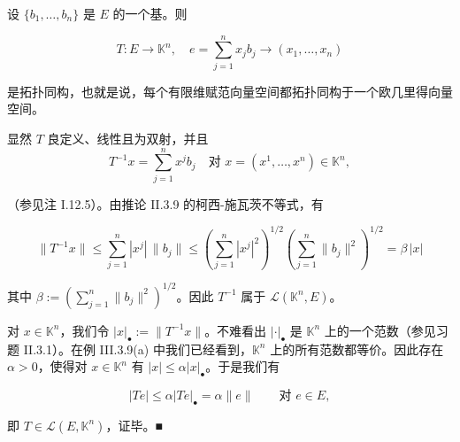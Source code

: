 \begin{theorem}

设 $ \{b_{1}, \ldots, b_{n}\} $ 是 $ E $ 的一个基。则

\begin{equation}
T : E \to \mathbb{K}^{n} , \quad e = \sum_{j=1}^{n} x_{j}b_{j} \to (x_{1}, \ldots, x_{n})\tag{1.3}
\end{equation}

是拓扑同构，也就是说，每个有限维赋范向量空间都拓扑同构于一个欧几里得向量空间。

\proofhead
显然 $ T $ 良定义、线性且为双射，并且
\[
T^{-1}x = \sum_{j=1}^{n} x^{j}b_{j} \quad \text{对 } x = (x^{1}, \ldots, x^{n}) \in \mathbb{K}^{n} ,
\]

（参见注 I.12.5）。由推论 II.3.9 的柯西-施瓦茨不等式，有

\[
\|T^{-1}x\| \le \sum_{j=1}^{n} |x^{j}|\,\|b_{j}\| \le \left( \sum_{j=1}^{n} |x^{j}|^{2} \right)^{1/2}\left( \sum_{j=1}^{n} \|b_{j}\|^{2} \right)^{1/2} = \beta\,|x|
\]

其中 $ \beta := \left( \sum_{j=1}^{n}\|b_{j}\|^{2} \right)^{1/2} $。因此 $ T^{-1} $ 属于 $ \mathcal{L}(\mathbb{K}^{n}, E) $。

对 $ x \in \mathbb{K}^{n} $，我们令 $ |x|_{\bullet} := \|T^{-1}x\| $。不难看出 $ |\cdot|_{\bullet} $ 是 $ \mathbb{K}^{n} $ 上的一个范数（参见习题 II.3.1）。在例 III.3.9(a) 中我们已经看到，$ \mathbb{K}^{n} $ 上的所有范数都等价。因此存在 $ \alpha > 0 $，使得对 $ x \in \mathbb{K}^{n} $ 有 $ |x| \le \alpha|x|_{\bullet} $。于是我们有

\[
|Te| \le \alpha|Te|_{\bullet} = \alpha\|e\| \qquad \text{对 } e \in E ,
\]

即 $ T \in \mathcal{L}(E, \mathbb{K}^{n}) $，证毕。\nobreak\hspace{0.35em}■

\end{theorem}

